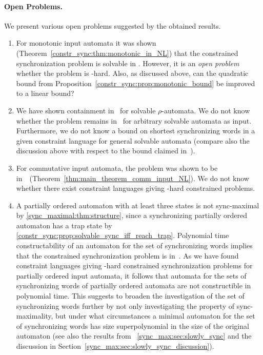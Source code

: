 \paragraph{Open Problems.} We present various open problems suggested by the obtained results.

\begin{enumerate}
	\item For monotonic input automata it was shown (Theorem~\ref{constr_sync:thm:monotonic_in_NL}) that the constrained synchronization problem is solvable in \NL. However, it is an \emph{open problem} whether the problem is \NL-hard. 
	Also, as discussed above, can the quadratic bound from 
	Proposition~\ref{constr_sync:prop:monotonic_bound} be improved to a linear bound?
	
	\item We have shown containment in \NP\ for solvable $\rho$-automata. We do not know whether
	the problem remains in \NP\  for arbitrary solvable automata as input.
	Furthermore, we do not know a bound on shortest synchronizing words
	in a given constraint language for general solvable automata (compare
	also the discussion above with respect to the bound claimed in~\cite{DBLP:conf/wia/Hoffmann22}).
	
	\item For commutative input automata, the problem was shown to be in~\NL\  (Theorem~\ref{thm:main_theorem_comm_input_NL}). We do not know whether there exist constraint languages giving \NL-hard constrained problems.
		
    \item A partially ordered automaton with at least three states is not sync-maximal
	by \cref{sync_maximal:thm:structure}, since
	a synchronizing partially ordered automaton has a trap state 
	by \cref{constr_sync:prop:solvable_sync_iff_reach_trap}. Polynomial time constructability
	of an automaton for the set of synchronizing words implies that the constrained synchronization
	problem is in~\PTIME. As we have found constraint languages giving \NP-hard
	constrained synchronization problems for partially ordered input automata,
	it follows that automata for the sets of synchronizing words of partially ordered automata are not 
	constructible in polynomial time.	
    This suggests to broaden the investigation
	of the set of synchronizing words further by not only investigating the property of sync-maximality,
	but under what circumstances a minimal automaton for the set of synchronizing words
	has size superpolynomial in the size of the original automaton (see also the results
	from \SEC~\ref{sync_max:sec:slowly_sync} and the discussion in Section~\ref{sync_max:sec:slowly_sync_discussion}).
	

\end{enumerate}
